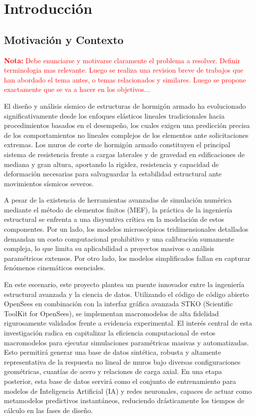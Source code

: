 \chapter{Introducción}
\label{c1} %

\section{Motivación y Contexto}

\textcolor{red}{\textbf{Nota: }Debe enunciarse y motivarse claramente el problema a resolver. Definir terminologia mas relevante. 
Luego se realiza una revision breve de trabajos que han abordado el tema antes, o temas relacionados y similares. 
Luego se propone exactamente que se va a hacer en los objetivos...}

\bigskip

El diseño y análisis sísmico de estructuras de hormigón armado ha evolucionado significativamente desde los enfoques elásticos lineales tradicionales hacia procedimientos basados en el desempeño, los cuales exigen una predicción precisa de los comportamientos no lineales complejos de los elementos ante solicitaciones extremas. Los muros de corte de hormigón armado constituyen el principal sistema de resistencia frente a cargas laterales y de gravedad en edificaciones de mediana y gran altura, aportando la rigidez, resistencia y capacidad de deformación necesarias para salvaguardar la estabilidad estructural ante movimientos sísmicos severos.

A pesar de la existencia de herramientas avanzadas de simulación numérica mediante el método de elementos finitos (MEF), la práctica de la ingeniería estructural se enfrenta a una disyuntiva crítica en la modelación de estos componentes. Por un lado, los modelos microscópicos tridimensionales detallados demandan un costo computacional prohibitivo y una calibración sumamente compleja, lo que limita su aplicabilidad a proyectos masivos o análisis paramétricos extensos. Por otro lado, los modelos simplificados fallan en capturar fenómenos cinemáticos esenciales.

En este escenario, este proyecto plantea un puente innovador entre la ingeniería estructural avanzada y la ciencia de datos. Utilizando el código de código abierto OpenSees en combinación con la interfaz gráfica avanzada STKO (Scientific ToolKit for OpenSees), se implementan macromodelos de alta fidelidad rigurosamente validados frente a evidencia experimental. El interés central de esta investigación radica en capitalizar la eficiencia computacional de estos macromodelos para ejecutar simulaciones paramétricas masivas y automatizadas. Esto permitirá generar una base de datos sintética, robusta y altamente representativa de la respuesta no lineal de muros bajo diversas configuraciones geométricas, cuantías de acero y relaciones de carga axial. En una etapa posterior, esta base de datos servirá como el conjunto de entrenamiento para modelos de Inteligencia Artificial (IA) y redes neuronales, capaces de actuar como metamodelos predictivos instantáneos, reduciendo drásticamente los tiempos de cálculo en las fases de diseño.



